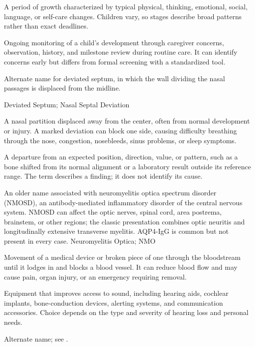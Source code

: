  A period of growth characterized by typical physical, thinking, emotional, social, language, or self-care changes. Children vary, so stages describe broad patterns rather than exact deadlines.

 Ongoing monitoring of a child’s development through caregiver concerns, observation, history, and milestone review during routine care. It can identify concerns early but differs from formal screening with a standardized tool.

 Alternate name for deviated septum, in which the wall dividing the nasal passages is displaced from the midline.

\synonyms
Deviated Septum; Nasal Septal Deviation

 A nasal partition displaced away from the center, often from normal development or injury. A marked deviation can block one side, causing difficulty breathing through the nose, congestion, nosebleeds, sinus problems, or sleep symptoms.

 A departure from an expected position, direction, value, or pattern, such as a bone shifted from its normal alignment or a laboratory result outside its reference range. The term describes a finding; it does not identify its cause.

 An older name associated with neuromyelitis optica spectrum disorder (NMOSD),
an antibody-mediated inflammatory disorder of the central nervous system. NMOSD can affect the optic nerves,
spinal cord, area postrema, brainstem, or other regions; the classic presentation combines optic neuritis
and longitudinally extensive transverse myelitis. AQP4-IgG is common but not present in every case.
\synonyms
Neuromyelitis Optica; NMO

 Movement of a medical device or broken piece of one through the bloodstream until it lodges in and blocks a blood vessel. It can reduce blood flow and may cause pain, organ injury, or an emergency requiring removal.

 Equipment that improves access to sound, including hearing aids, cochlear implants, bone-conduction devices, alerting systems, and communication accessories. Choice depends on the type and severity of hearing loss and personal needs.

 Alternate name; see .

